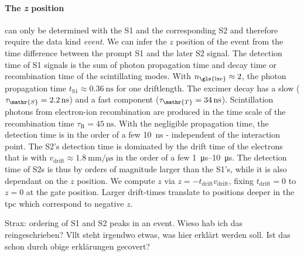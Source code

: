 \paragraph{The \emph{z} position} can only be determined with the S1 and the corresponding S2 and therefore require the data kind \emph{event}.
We can infer the $ z $ position of the event from the time difference between the prompt S1 and the later S2 signal.
The detection time of S1 signals is the sum of photon propagation time and decay time or recombination time of the scintillating modes.
With $ n_\mathrm{\gls{lxe}} \approx 2 $, the photon propagation time $ t_\mathrm{S1} \approx \SI{0.36}{\nano\second} $ for one driftlength. %
The excimer decay has a slow ($ \tau_\mathr{S} = \SI{2.2}{\nano\second} $) and a fast component ($ \tau_\mathr{T} = \SI{34}{\nano\second} $).  %
Scintillation photons from electron-ion recombination are produced in the time scale of the recombination time $ \tau_\mathrm{R} = \SI{45}{\nano\second} $.  %
With the negligible propagation time, the detection time is in the order of a few \SI{10}{\nano\second} - independent of the interaction point.  %
The S2's detection time is dominated by the drift time of the electrons that is with $ v_\mathrm{drift} \approx \SI{1.8}{\milli\meter\per\micro\second} $ in the order of a few \SIrange{1}{10}{\micro\second}.  %
The detection time of S2s is thus by orders of magnitude larger than the S1's, while it is also dependant on the $ z $ position.
We compute $ z $ via $ z = - t_\mathrm{drift} v_\mathrm{drift} $, fixing $ t_\mathrm{drift} = 0 $ to $ z = 0 $ at the gate position.
Larger drift-times translate to positions deeper in the \gls{tpc} which correspond to negative $ z $.





Strax: ordering of S1 and S2 peaks in an event. Wieso hab ich das reingeschrieben? Vllt steht irgendwo etwas, was hier erklärt werden soll. Ist das schon durch obige erklärungen gecovert?
